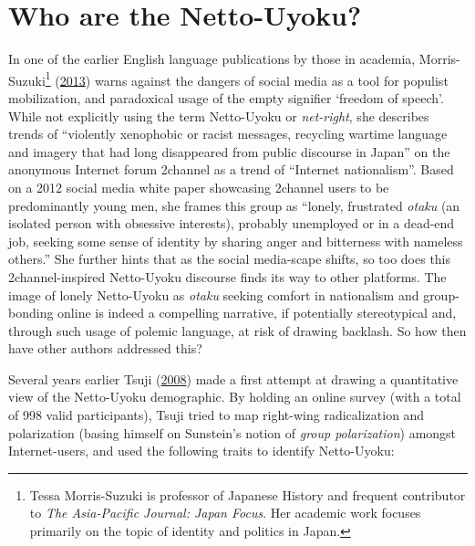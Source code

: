 \documentclass[10pt,british,A4paper,twoside]{memoir}
\begin{document}
\section{Who are the Netto-Uyoku?}\label{who-are-the-netto-uyoku}

In one of the earlier English language publications by those in
academia, Morris-Suzuki\footnote{Tessa Morris-Suzuki is professor of
  Japanese History and frequent contributor to \emph{The Asia-Pacific
  Journal: Japan Focus}. Her academic work focuses primarily on the
  topic of identity and politics in Japan.}
(\protect\hyperlink{ref-morris-suzuki_freedom_2013}{2013}) warns against
the dangers of social media as a tool for populist mobilization, and
paradoxical usage of the empty signifier `freedom of speech'. While not
explicitly using the term Netto-Uyoku or \emph{net-right}, she describes
trends of ``violently xenophobic or racist messages, recycling wartime
language and imagery that had long disappeared from public discourse in
Japan'' on the anonymous Internet forum 2channel as a trend of
``Internet nationalism''. Based on a 2012 social media white paper
showcasing 2channel users to be predominantly young men, she frames this
group as ``lonely, frustrated \emph{otaku} (an isolated person with
obsessive interests), probably unemployed or in a dead-end job, seeking
some sense of identity by sharing anger and bitterness with nameless
others.'' She further hints that as the social media-scape shifts, so
too does this 2channel-inspired Netto-Uyoku discourse finds its way to
other platforms. The image of lonely Netto-Uyoku as \emph{otaku} seeking
comfort in nationalism and group-bonding online is indeed a compelling
narrative, if potentially stereotypical and, through such usage of
polemic language, at risk of drawing backlash. So how then have other
authors addressed this?

Several years earlier Tsuji
(\protect\hyperlink{ref-tsuji_eng:_2008}{2008}) made a first attempt at
drawing a quantitative view of the Netto-Uyoku demographic. By holding
an online survey (with a total of 998 valid participants), Tsuji tried
to map right-wing radicalization and polarization (basing himself on Sunstein's
notion of \emph{group polarization}) amongst Internet-users, and used
the following traits to identify Netto-Uyoku:
\end{document}
